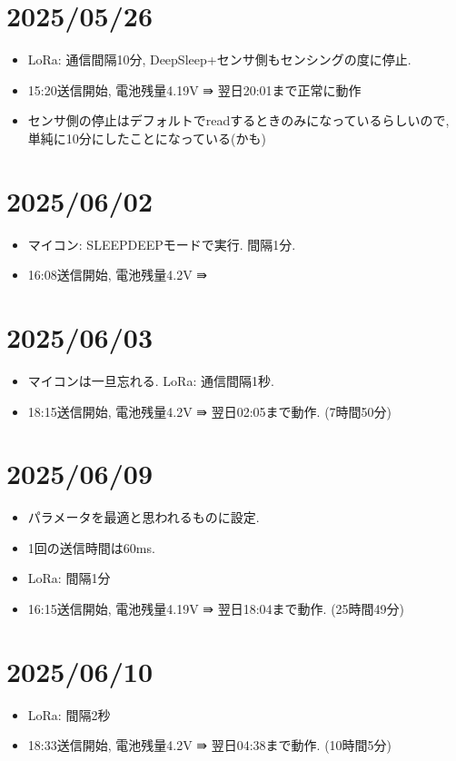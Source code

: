 \section{2025/05/26}
\begin{itemize}
    \item LoRa: 通信間隔10分, DeepSleep+センサ側もセンシングの度に停止.
    \item 15:20送信開始, 電池残量4.19V ⇛ 翌日20:01まで正常に動作
    \item センサ側の停止はデフォルトでreadするときのみになっているらしいので, 単純に10分にしたことになっている(かも)
\end{itemize}

\section{2025/06/02}
\begin{itemize}
    \item マイコン: SLEEPDEEPモードで実行. 間隔1分.
    \item 16:08送信開始, 電池残量4.2V ⇛ 
\end{itemize}


\section{2025/06/03}
\begin{itemize}
    \item マイコンは一旦忘れる. LoRa: 通信間隔1秒. 
    \item 18:15送信開始, 電池残量4.2V ⇛ 翌日02:05まで動作. (7時間50分)
\end{itemize}

\section{2025/06/09}
\begin{itemize}
    \item パラメータを最適と思われるものに設定. 
    \item 1回の送信時間は60ms. 
    \item LoRa: 間隔1分
    \item 16:15送信開始, 電池残量4.19V ⇛ 翌日18:04まで動作. (25時間49分)
\end{itemize}

\section{2025/06/10}
\begin{itemize}
    \item LoRa: 間隔2秒
    \item 18:33送信開始, 電池残量4.2V ⇛ 翌日04:38まで動作. (10時間5分)
\end{itemize}

